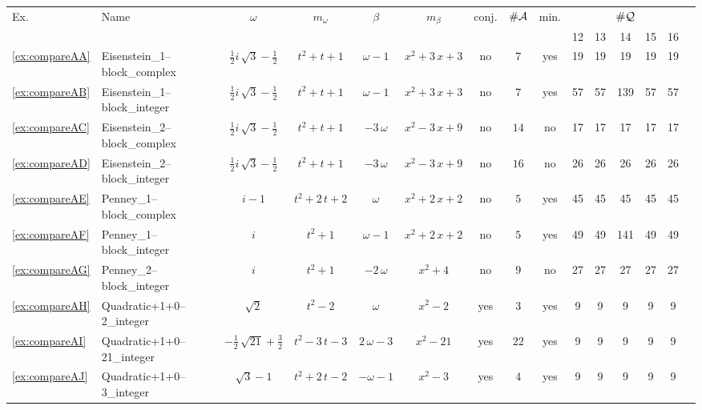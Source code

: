 \begin{tabular}{ll|c c c c|ccc|c c  c  c  c  c  }
\multirow{2}{*}{Ex.} &\multirow{2}{*}{Name} & \multirow{2}{*}{$\omega$} & \multirow{2}{*}{$m_\omega$} & \multirow{2}{*}{$\beta$} & \multirow{2}{*}{$m_\beta$} & \multirow{2}{*}{conj.} & \multirow{2}{*}{$\#\mathcal{A}$} & \multirow{2}{*}{min.} & \multicolumn{5}{c}{$\#\mathcal{Q}$} \\
 &  &  &  &  &  &  &  &  & 12 & 13 & 14 & 15 & 16 \\ \hline
\ref{ex:compareAA} & Eisenstein\_1--block\_complex & $ \frac{1}{2} i \, \sqrt{3} - \frac{1}{2} $ & $ t^{2} + t + 1 $ & $ \omega - 1 $ & $ x^{2} + 3 \, x + 3 $ & no & $ 7 $ & yes & 19 & 19 & 19 & 19 & 19 \\
\ref{ex:compareAB} & Eisenstein\_1--block\_integer & $ \frac{1}{2} i \, \sqrt{3} - \frac{1}{2} $ & $ t^{2} + t + 1 $ & $ \omega - 1 $ & $ x^{2} + 3 \, x + 3 $ & no & $ 7 $ & yes & 57 & 57 & 139 & 57 & 57 \\
\ref{ex:compareAC} & Eisenstein\_2--block\_complex & $ \frac{1}{2} i \, \sqrt{3} - \frac{1}{2} $ & $ t^{2} + t + 1 $ & $ -3 \, \omega $ & $ x^{2} - 3 \, x + 9 $ & no & $ 14 $ & no & 17 & 17 & 17 & 17 & 17 \\
\ref{ex:compareAD} & Eisenstein\_2--block\_integer & $ \frac{1}{2} i \, \sqrt{3} - \frac{1}{2} $ & $ t^{2} + t + 1 $ & $ -3 \, \omega $ & $ x^{2} - 3 \, x + 9 $ & no & $ 16 $ & no & 26 & 26 & 26 & 26 & 26 \\
\ref{ex:compareAE} & Penney\_1--block\_complex & $ i - 1 $ & $ t^{2} + 2 \, t + 2 $ & $ \omega $ & $ x^{2} + 2 \, x + 2 $ & no & $ 5 $ & yes & 45 & 45 & 45 & 45 & 45 \\
\ref{ex:compareAF} & Penney\_1--block\_integer & $ i $ & $ t^{2} + 1 $ & $ \omega - 1 $ & $ x^{2} + 2 \, x + 2 $ & no & $ 5 $ & yes & 49 & 49 & 141 & 49 & 49 \\
\ref{ex:compareAG} & Penney\_2--block\_integer & $ i $ & $ t^{2} + 1 $ & $ -2 \, \omega $ & $ x^{2} + 4 $ & no & $ 9 $ & no & 27 & 27 & 27 & 27 & 27 \\
\ref{ex:compareAH} & Quadratic+1+0--2\_integer & $ \sqrt{2} $ & $ t^{2} - 2 $ & $ \omega $ & $ x^{2} - 2 $ & yes & $ 3 $ & yes & 9 & 9 & 9 & 9 & 9 \\
\ref{ex:compareAI} & Quadratic+1+0--21\_integer & $ -\frac{1}{2} \, \sqrt{21} + \frac{3}{2} $ & $ t^{2} - 3 \, t - 3 $ & $ 2 \, \omega - 3 $ & $ x^{2} - 21 $ & yes & $ 22 $ & yes & 9 & 9 & 9 & 9 & 9 \\
\ref{ex:compareAJ} & Quadratic+1+0--3\_integer & $ \sqrt{3} - 1 $ & $ t^{2} + 2 \, t - 2 $ & $ -\omega - 1 $ & $ x^{2} - 3 $ & yes & $ 4 $ & yes & 9 & 9 & 9 & 9 & 9 \\

\end{tabular}
